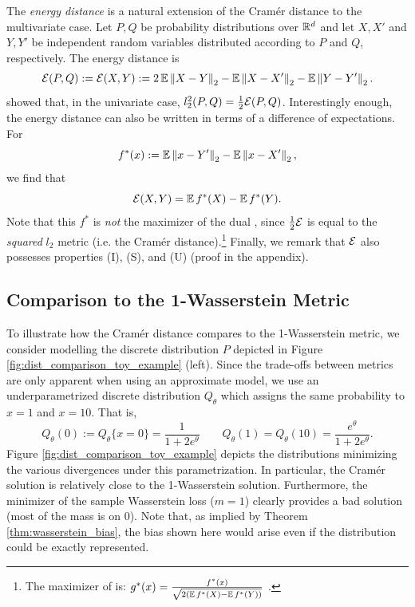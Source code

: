 \documentclass{article}
\def \Qtheta {Q_\theta}
\begin{document}
The \emph{energy distance} \citep{szekely02estatistics} is a natural extension of the Cram{\'e}r distance to the multivariate case. Let $P, Q$ be probability distributions over $\mathbb{R}^d$ and let $X, X'$ and $Y, Y'$ be independent random variables distributed according to $P$ and $Q$, respectively. The energy distance \citep[sometimes called the squared energy distance, see e.g.][]{rizzo2016energy} is
\begin{equation}
\cE(P, Q) := \cE(X, Y) := 2 \expect \norm{X - Y}_2 - \expect \norm{X - X'}_2 - \expect \norm{Y - Y'}_2. 
\label{eqn:energy_distance}
\end{equation}
\citeauthor{szekely02estatistics} showed that, in the univariate case, $l_2^2(P, Q) = \tfrac{1}{2} \mathcal{E}(P, Q)$. Interestingly enough, the energy distance can also be written in terms of a difference of expectations. For
\begin{equation*}
f^*(x) := \expect \norm{x - Y'}_2 - \expect \norm{x - X'}_2,
\end{equation*}
we find that
\begin{equation}
\cE(X, Y) = \expect f^*(X) - \expect f^*(Y).\label{eqn:energy_distance_dual}
\end{equation}
Note that this $f^*$ is \emph{not} the maximizer of the dual , since $\frac{1}{2} \mathcal{E}$ is equal to the \emph{squared} $l_2$ metric (i.e. the Cram\'er distance).\footnote{The maximizer of  is: $g^*(x) = \frac{f^*(x)}{\sqrt{2 (\expect f^*(X) - \expect f^*(Y))}}$ \citep[based on results by][]{gretton2012kernel}. }
Finally, we remark that $\mathcal{E}$ also possesses properties (I), (S), and (U) (proof in the appendix).

\subsection{Comparison to the 1-Wasserstein Metric}\label{sec:impact_wasserstein_bias}

To illustrate how the Cram\'er distance compares to the 1-Wasserstein metric, we consider modelling the discrete distribution $P$ depicted in Figure \ref{fig:dist_comparison_toy_example} (left). Since the trade-offs between metrics are only apparent when using an approximate model, we use an underparametrized discrete distribution $\Qtheta$ which assigns the same probability to $x = 1$ and $x = 10$. That is,
\begin{equation*}
\Qtheta(0) := \Qtheta\{x = 0\} = \frac{1}{1 + 2 e^\theta} \qquad \Qtheta(1) = \Qtheta(10) = \frac{e^{\theta}}{1 + 2 e^{\theta}} .
\end{equation*}
Figure \ref{fig:dist_comparison_toy_example} depicts the distributions minimizing the various divergences under this parametrization. In particular, the Cram\'er solution is relatively close to the 1-Wasserstein solution. Furthermore, the minimizer of the sample Wasserstein loss ($m = 1$) clearly provides a bad solution (most of the mass is on 0). Note that, as implied by Theorem \ref{thm:wasserstein_bias}, the bias shown here would arise even if the distribution could be exactly represented.
\end{document}
